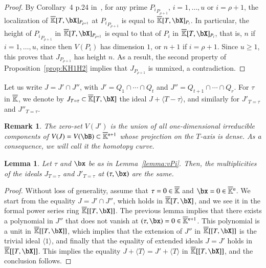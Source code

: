 \documentclass[amsthm]{elsart}
\newtheorem{lemma}[definition]{Lemma}
\newtheorem{remark}[definition]{Remark}
\begin{document}
\begin{proof}
  By Corollary~4 p.24 in~\cite{Matsumura86}, for any prime
  ${P_i}_{P_{\rho+1}}$, $i=1,\dots,u$ or $i=\rho+1$, the localization of
  $\KKbar[T,\bX]_{P_{\rho+1}}$ at ${P_i}_{P_{\rho+1}}$ is equal to
  $\KKbar[T,\bX]_{P_{i}}$. In particular, the height of
  ${P_i}_{P_{\rho+1}}$ in $\KKbar[T,\bX]_{P_{\rho+1}}$ is equal to that of
  $P_i$ in $\KKbar[T,\bX]_{P_{i}}$, that is, $n$ if $i=1,\dots,u$,
  since then $V(P_i)$ has dimension $1$, or $n+1$ if $i=\rho+1$. Since $u
  \ge 1$, this proves that $J_{P_{\rho+1}}$ has height $n$. As a result,
  the second property of Proposition~\ref{prop:KH1H2} implies that
  $J_{P_{\rho+1}}$ is unmixed, a contradiction.
\end{proof}

Let us write $J=J' \cap J''$, with $J'=Q_1 \cap \cdots \cap Q_t$ and
$J''=Q_{t+1} \cap \cdots \cap Q_r$. For $\tau$ in $\overline{\mathbb{K}}$, we denote
by $J_{T=\tau} \subset \KKbar[T,\bX]$ the ideal $J + \langle T-\tau \rangle$,
and similarly for $J'_{T=\tau}$ and $ J''_{T=\tau}$.

\begin{remark}\label{rem:Jprime}
  The zero-set $V(J')$ is the union of all one-dimensional irreducible
  components of $V(J)=V(\bB) \subset \KKbar{}^{n+1}$ whose projection on
  the $T$-axis is dense. As a consequence, we will call it the {\em
    homotopy curve}.
\end{remark}

\begin{lemma}\label{lemma:JJprime}
  Let $\tau$ and $\bx$ be as in Lemma~\ref{lemma:vPi}. Then, the
  multiplicities of the ideals $J_{T=\tau}$ and $J'_{T=\tau}$ at $(\tau,\bx)$
  are the same.
\end{lemma}
\begin{proof}
  Without loss of generality, assume that $\tau=0 \in \overline{\mathbb{K}}$ and
  $\bx=0 \in \KKbar{}^n$. We start from the equality $J=J' \cap J''$,
  which holds in $\KKbar[T,\bX]$, and we see it in the formal power
  series ring $\KKbar[[T,\bX]]$.  The previous lemma implies that
  there exists a polynomial in $J''$ that does not vanish at
  $(\tau,\bx)=0 \in \KKbar{}^{n+1}$.  This polynomial is a unit in
  $\KKbar[[T,\bX]]$, which implies that the extension of $J''$ in
  $\KKbar[[T,\bX]]$ is the trivial ideal $\langle 1 \rangle$, and
  finally that the equality of extended ideals $J=J'$ holds in
  $\KKbar[[T,\bX]]$. This implies the equality
  $J+\langle T \rangle =J'+\langle T \rangle $ in $\KKbar[[T,\bX]]$,
  and the conclusion follows.
\end{proof}
\end{document}
